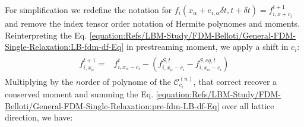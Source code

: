 \documentclass[letterpaper,10pt,english,openany,oneside]{jupyterBook}
\begin{document}
\sphinxAtStartPar
For simplification we redefine the notation for \(f_i( x_{\alpha} + e_{i,\alpha} \delta t, t+\delta t)=f_{i,x+c_{i}}^{t+1}\) and remove the index tensor order notation of Hermite polynomes and moments. Reinterpreting the Eq. \eqref{equation:Refs/LBM-Study/FDM-Belloti/General-FDM-Single-Relaxation:LB-fdm-df-Eq} in pre\sphinxhyphen{}streaming moment, we apply a shift in \(c_{i}\):
\begin{equation*}
\begin{split}
\begin{array}{rl}
f_{i,x_{\alpha}}^{t+1} = & f_{i,x_{\alpha}-c_{i}}^{t} - \left( f_{i,x_{\alpha}-c_{i}}^{S,t} - f_{i,x_{\alpha}-c_{i}}^{S,eq,t} \right)
\end{array}
\end{split}
\end{equation*}
\sphinxAtStartPar
Multiplying by the \(n\)\sphinxhyphen{}order of polynome of the \(\mathcal{C}_{c_{i}}^{(n)}\), that correct recover a conserved moment and summing the Eq. \eqref{equation:Refs/LBM-Study/FDM-Belloti/General-FDM-Single-Relaxation:pre-fdm-LB-df-Eq} over all lattice direction, we have:
\end{document}
